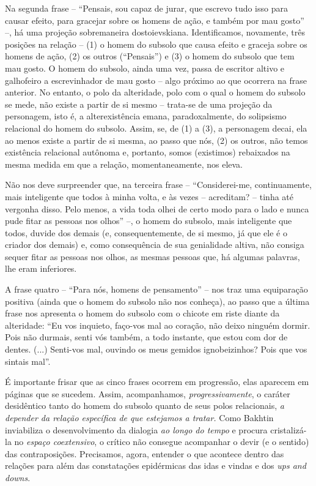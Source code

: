 Na segunda frase -- ``Pensais, sou capaz de jurar, que escrevo tudo isso
para causar efeito, para gracejar sobre os homens de ação, e também por
mau gosto'' --, há uma projeção sobremaneira dostoievskiana.
Identificamos, novamente, três posições na relação -- (1) o homem do
subsolo que causa efeito e graceja sobre os homens de ação, (2) os
outros (``Pensais'') e (3) o homem do subsolo que tem mau gosto. O homem
do subsolo, ainda uma vez, passa de escritor altivo e galhofeiro a
escrevinhador de mau gosto -- algo próximo ao que ocorrera na frase
anterior. No entanto, o polo da alteridade, polo com o qual o homem do
subsolo se mede, não existe a partir de si mesmo -- trata-se de uma
projeção da personagem, isto é, a alterexistência emana, paradoxalmente,
do solipsismo relacional do homem do subsolo. Assim, se, de (1) a (3), a
personagem decai, ela ao menos existe a partir de si mesma, ao passo que
nós, (2) os outros, não temos existência relacional autônoma e,
portanto, somos (existimos) rebaixados na mesma medida em que a relação,
momentaneamente, nos eleva.

Não nos deve surpreender que, na terceira frase -- ``Considerei-me,
continuamente, mais inteligente que todos à minha volta, e às vezes --
acreditam? -- tinha até vergonha disso. Pelo menos, a vida toda olhei de
certo modo para o lado e nunca pude fitar as pessoas nos olhos'' --, o
homem do subsolo, mais inteligente que todos, duvide dos demais (e,
consequentemente, de si mesmo, já que ele é o criador dos demais) e,
como consequência de sua genialidade altiva, não consiga sequer fitar as
pessoas nos olhos, as mesmas pessoas que, há algumas palavras, lhe eram
inferiores.

A frase quatro -- ``Para nós, homens de pensamento'' -- nos traz uma
equiparação positiva (ainda que o homem do subsolo não nos conheça), ao
passo que a última frase nos apresenta o homem do subsolo com o chicote
em riste diante da alteridade: ``Eu vos inquieto, faço-vos mal ao
coração, não deixo ninguém dormir. Pois não durmais, senti vós também, a
todo instante, que estou com dor de dentes. (...) Senti-vos mal, ouvindo
os meus gemidos ignobeizinhos? Pois que vos sintais mal''.

É importante frisar que as cinco frases ocorrem em progressão, elas
aparecem em páginas que se sucedem. Assim, acompanhamos,
\emph{progressivamente}, o caráter desidêntico tanto do homem do subsolo
quanto de seus polos relacionais, \emph{a depender da relação específica
de que estejamos a tratar.} Como Bakhtin inviabiliza o desenvolvimento
da dialogia \emph{ao longo do tempo} e procura cristalizá-la no
\emph{espaço coextensivo}, o crítico não consegue acompanhar o devir (e
o sentido) das contraposições. Precisamos, agora, entender o que
acontece dentro das relações para além das constatações epidérmicas das
idas e vindas e dos \emph{ups and downs}.


